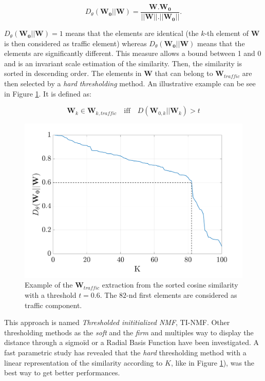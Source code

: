 \documentclass[twocolumn,a4paper,10pt]{article}
\begin{document}
\begin{equation}
D_{\theta}\left(\mathbf{W_0} \vert \vert \mathbf{W} \right) = \frac{\mathbf{W}.\mathbf{W_0}}{\vert \vert \mathbf{W}  \vert \vert . \vert \vert \mathbf{W_0} \vert \vert}.
\end{equation}

$D_{\theta}\left(\mathbf{W_0} \vert \vert \mathbf{W} \right) = 1$ means that the elements are identical (the $k$-th element of $\mathbf{W}$ is then considered as traffic element) whereas $D_{\theta}\left(\mathbf{W_0} \vert \vert \mathbf{W} \right)$ means that the elements are significantly different. This measure allows a bound between 1 and 0 and is an invariant scale estimation of the similarity. Then, the similarity is sorted in descending order. The elements in $\mathbf{W}$ that can belong to $\mathbf{W}_{traffic}$ are then selected by a \textit{hard thresholding} method. An illustrative example can be see in Figure \ref{fig:W_ThC_NMF}. It is defined as:

\begin{equation}
\mathbf{W}_k \in \mathbf{W}_{k,traffic} \quad \text{iff} \quad D\left(\mathbf{W}_{0,k} \vert \vert \mathbf{W}_{k} \right) > t
\end{equation}

\begin{figure}[hbtp]
\centering
\includegraphics[width=0.8\linewidth]{figures/distanceCosLinDisplay.pdf}
\caption{Example of the $\mathbf{W}_{traffic}$ extraction from the sorted cosine similarity with a threshold $t = 0.6$. The $82$-nd first elements are considered as traffic component.}
\label{fig:W_ThC_NMF}
\end{figure}

This approach is named \textit{Thresholded inititialized NMF}, TI-NMF. Other thresholding methods as the \textit{soft} \cite{donoho1995noising}and the \textit{firm} \cite{fornasier2008iterative} and multiples way to display the distance through a sigmoïd or a Radial Basis Function have been investigated. A fast parametric study has revealed that the \textit{hard} thresholding method  with a linear representation of the similarity according to $K$, like in  Figure \ref{fig:W_ThC_NMF}), was the best way to get better performances.
\end{document}
